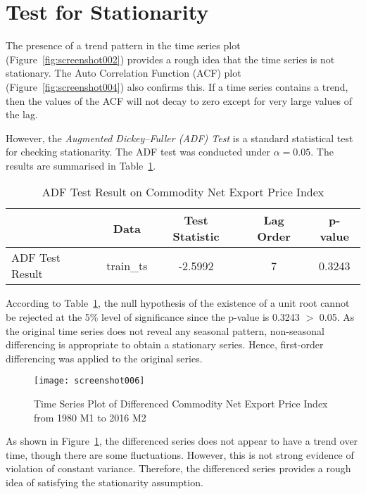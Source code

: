 \documentclass[12pt,a4paper]{report} %
\begin{document}
	
	\section{Test for Stationarity}
	
	The presence of a trend pattern in the time series plot (Figure~\ref{fig:screenshot002}) provides a rough idea that the time series is not stationary. The Auto Correlation Function (ACF) plot (Figure~\ref{fig:screenshot004}) also confirms this. If a time series contains a trend, then the values of the ACF will not decay to zero except for very large values of the lag.  
	
	However, the \textit{Augmented Dickey–Fuller (ADF) Test} is a standard statistical test for checking stationarity. The ADF test was conducted under $\alpha = 0.05$. The results are summarised in Table~\ref{tab:adf}.
	
	
	\begin{table}[h!]
		\centering
		\caption{ADF Test Result on Commodity Net Export Price Index}
		\label{tab:adf}
		\begin{tabular}{l c c c c}
			\toprule
			& \textbf{Data} & \textbf{Test Statistic} & \textbf{Lag Order} & \textbf{p-value} \\
			\midrule
			ADF Test Result & train\_ts & -2.5992 & 7 & 0.3243 \\
			\bottomrule
		\end{tabular}
	\end{table}
	
	According to Table~\ref{tab:adf}, the null hypothesis of the existence of a unit root cannot be rejected at the 5\% level of significance since the p-value is 0.3243 $>$ 0.05. As the original time series does not reveal any seasonal pattern, non-seasonal differencing is appropriate to obtain a stationary series. Hence, first-order differencing was applied to the original series.
	
	
	\begin{figure}[h!]
		\centering
		\texttt{[image: screenshot006]}
		\caption{Time Series Plot of Differenced Commodity Net Export Price Index from 1980 M1 to 2016 M2}
		\label{fig:screenshot006}
	\end{figure}
	
	
	As shown in Figure~\ref{fig:screenshot006}, the differenced series does not appear to have a trend over time, though there are some fluctuations. However, this is not strong evidence of violation of constant variance. Therefore, the differenced series provides a rough idea of satisfying the stationarity assumption.  
	
\end{document}
